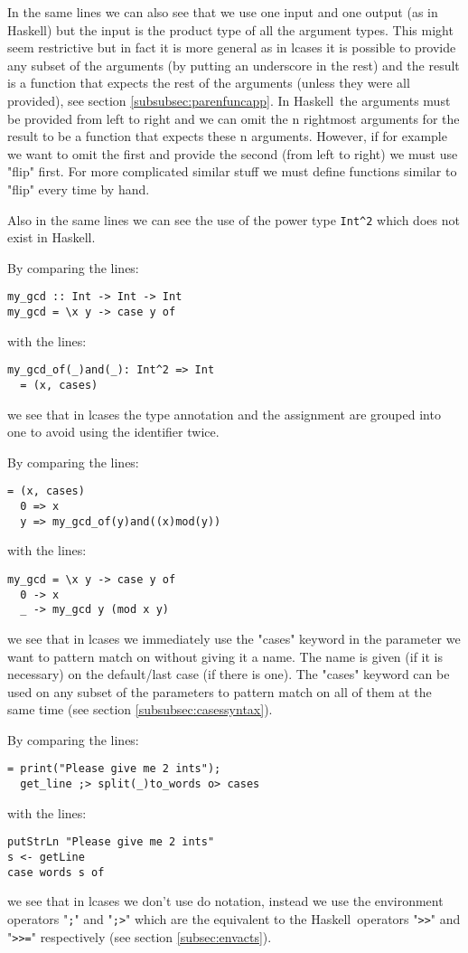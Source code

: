 \documentclass[diploma]{softlab-thesis}
\def\H{Haskell}
\begin{document}
In the same lines we can also see that we use one input and one output (as in
\H) but the input is the product type of all the argument types. This might
seem restrictive but in fact it is more general as in lcases it is possible to
provide any subset of the arguments (by putting an underscore in the rest) and
the result is a function that expects the rest of the arguments (unless they
were all provided), see section \ref{subsubsec:parenfuncapp}. In \H\ the
arguments must be provided from left to right and we can omit the n rightmost
arguments for the result to be a function that expects these n arguments.
However, if for example we want to omit the first and provide the second (from
left to right) we must use "flip" first. For more complicated similar stuff
we must define functions similar to "flip" every time by hand.

Also in the same lines we can see the use of the power type \verb|Int^2|
which does not exist in \H.

By comparing the lines:
\begin{verbatim}
my_gcd :: Int -> Int -> Int
my_gcd = \x y -> case y of
\end{verbatim}
with the lines:
\begin{verbatim}
my_gcd_of(_)and(_): Int^2 => Int
  = (x, cases)
\end{verbatim}
we see that in lcases the type annotation and the assignment are grouped into
one to avoid using the identifier twice.

By comparing the lines:
\begin{verbatim}
= (x, cases)
  0 => x
  y => my_gcd_of(y)and((x)mod(y))
\end{verbatim}
with the lines:
\begin{verbatim}
my_gcd = \x y -> case y of
  0 -> x
  _ -> my_gcd y (mod x y)
\end{verbatim}
we see that in lcases we immediately use the "cases" keyword in the parameter
we want to pattern match on without giving it a name. The name is given (if it
is necessary) on the default/last case (if there is one).  The "cases" keyword
can be used on any subset of the parameters to pattern match on all of them at
the same time (see section \ref{subsubsec:casessyntax}).

By comparing the lines:
\begin{verbatim}
= print("Please give me 2 ints");
  get_line ;> split(_)to_words o> cases
\end{verbatim}
with the lines:
\begin{verbatim}
putStrLn "Please give me 2 ints"
s <- getLine
case words s of
\end{verbatim}
we see that in lcases we don't use do notation, instead we use the environment
operators "\verb|;|" and "\verb|;>|" which are the equivalent to the \H\
operators "\verb|>>|" and "\verb|>>=|" respectively (see section
\ref{subsec:envacts}).
\end{document}
